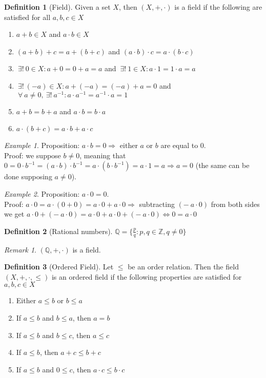 \documentclass{article}
\newcommand{\Ar}{\Rightarrow}
\newenvironment{enumrom}{\begin{enumerate}[label=(\roman*)]}{\end{enumerate}}
\newcommand{\fr}[2]{\frac{#1}{#2}}
\theoremstyle{definition}
\newtheorem{definition}{Definition}[section]
\theoremstyle{definition}
\theoremstyle{plain}
\theoremstyle{plain}
\theoremstyle{plain}
\theoremstyle{plain}
\theoremstyle{definition}
\theoremstyle{remark}
\newtheorem{exampled}{Example}[definition]
\theoremstyle{remark}
\theoremstyle{remark}
\theoremstyle{remark}
\newtheorem*{remark}{Remark}
\newcommand{\Z}{\mathbb{Z}}
\newcommand{\Q}{\mathbb{Q}}
\newcommand{\ForAll}{\ \forall \ }
\newcommand{\ExistsI}{\ \exists! \ }
\begin{document}
\begin{definition}[Field]
  Given a set $X$, then $(X, +, \cdot)$ is a field if the following are satisfied for all $a, b, c \in X$
  \begin{enumrom}
  \item $a + b \in X$ and $a \cdot b \in X$
  \item $(a + b) + c = a + (b + c)$ and $(a \cdot b) \cdot c = a \cdot (b \cdot c)$
  \item $\ExistsI 0 \in X : a + 0 = 0 + a = a$ and $\ExistsI 1 \in X : a \cdot 1 = 1 \cdot a = a$
  \item $\ExistsI (-a) \in X : a + (-a) = (-a) + a = 0$ and $\ForAll a \neq 0, \ExistsI a^{-1} : a \cdot a^{-1} = a^{-1} \cdot a = 1$
  \item $a + b = b + a$ and $a \cdot b = b\cdot a$
  \item $a \cdot (b + c) = a \cdot b + a \cdot c$
  \end{enumrom}
\end{definition}

\begin{exampled}
  Proposition: $a \cdot b = 0 \Ar$ either $a$ or $b$ are equal to 0.\\
  Proof: we suppose $b \neq 0$, meaning that $0 = 0 \cdot b^{-1} = (a \cdot b) \cdot b^{-1} = a \cdot (b \cdot b^{-1}) = a \cdot 1 = a \Ar a = 0$ (the same can be done supposing $a \neq 0$).
\end{exampled}

\begin{exampled}
  Proposition: $a \cdot 0 = 0$.\\
  Proof: $a \cdot 0 = a \cdot (0 + 0) = a \cdot 0 + a \cdot 0 \Ar$ subtracting $(- \ a \cdot 0)$ from both sides we get $a \cdot 0 + (- \ a \cdot 0) = a \cdot 0 + a \cdot 0 + (- \ a \cdot 0) \iff 0 = a \cdot 0$
\end{exampled}


\begin{definition}[Rational numbers]
  $\Q = \{ \fr{p}{q} : p, q \in \Z, q \neq 0 \}$
\end{definition}

\begin{remark}
  $(\Q, +, \cdot)$ is a field.
\end{remark}


\begin{definition}[Ordered Field]
  Let $\leq$ be an order relation. Then the field $(X, +, \cdot, \leq)$ is an ordered field if the following properties are satisfied for $a, b, c\in X$
  \begin{enumrom}
  \item Either $a \leq b$ or $b \leq a$
  \item If $a \leq b$ and $b \leq a$, then $a = b$
  \item If $a \leq b$ and $b \leq c$, then $a \leq c$
  \item If $a \leq b$, then $a + c \leq b + c$
  \item If $a \leq b$ and $0 \leq c$, then $a \cdot c \leq b \cdot c$
  \end{enumrom}
\end{definition}
\end{document}

